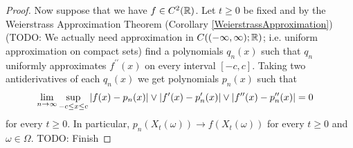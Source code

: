 \begin{proof}
Now suppose that we have $f \in C^2(\mathbb{R})$.  Let $t \geq 0$ be fixed and by the Weierstrass Approximation Theorem (Corollary \ref{WeierstrassApproximation}) (TODO: We actually need approximation in $C((-\infty, \infty); \mathbb{R})$; i.e. uniform approximation on compact sets) find a polynomials $q_n(x)$ such that $q_n$ uniformly approximates $f^{\prime \prime}(x)$ on every interval $[-c,c]$.  Taking two antiderivatives of each $q_n(x)$ we get polynomials $p_n(x)$ such that 
\begin{align*}
\lim_{n \to \infty} \sup_{-c \leq x \leq c} \left \vert f(x) - p_n(x) \right \vert \vee \left \vert f^{\prime}(x) - p^{\prime}_n(x) \right \vert  \vee \left \vert f^{\prime\prime}(x) - p^{\prime\prime}_n(x) \right \vert &= 0
\end{align*}
for every $t \geq 0$.  In particular, $p_n(X_t(\omega)) \to f(X_t(\omega))$ for every $t \geq 0$ and $\omega \in \Omega$.
TODO: Finish
\end{proof}

